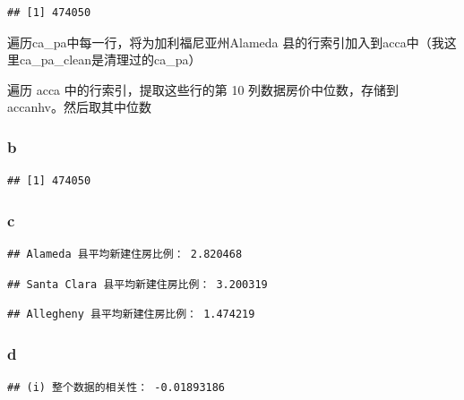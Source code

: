 \documentclass[
]{article}
\newenvironment{Shaded}{\begin{snugshade}}{\end{snugshade}}
\newcommand{\DecValTok}[1]{\textcolor[rgb]{0.00,0.00,0.81}{#1}}
\newcommand{\FunctionTok}[1]{\textcolor[rgb]{0.13,0.29,0.53}{\textbf{#1}}}
\newcommand{\NormalTok}[1]{#1}
\newcommand{\SpecialCharTok}[1]{\textcolor[rgb]{0.81,0.36,0.00}{\textbf{#1}}}
\begin{document}
\begin{verbatim}
## [1] 474050
\end{verbatim}

遍历ca\_pa中每一行，将为加利福尼亚州Alameda
县的行索引加入到acca中（我这里ca\_pa\_clean是清理过的ca\_pa）

遍历 acca 中的行索引，提取这些行的第 10 列数据房价中位数，存储到
accanhv。然后取其中位数

\subsubsection{b}\label{b-3}

\begin{Shaded}
\end{Shaded}

\begin{verbatim}
## [1] 474050
\end{verbatim}

\subsubsection{c}\label{c-2}

\begin{verbatim}
## Alameda 县平均新建住房比例： 2.820468
\end{verbatim}

\begin{verbatim}
## Santa Clara 县平均新建住房比例： 3.200319
\end{verbatim}

\begin{verbatim}
## Allegheny 县平均新建住房比例： 1.474219
\end{verbatim}

\subsubsection{d}\label{d-1}

\begin{verbatim}
## (i) 整个数据的相关性： -0.01893186
\end{verbatim}
\end{document}
